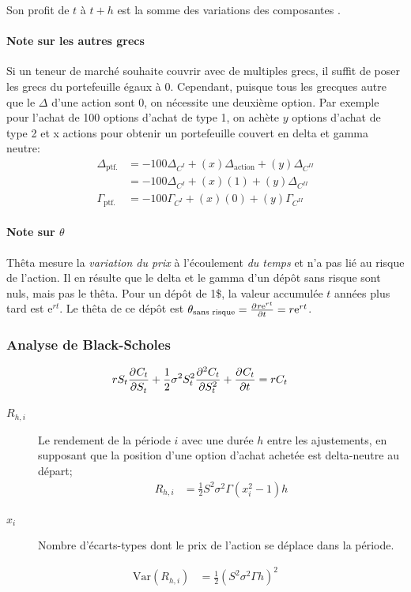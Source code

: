 \documentclass[10pt, french]{article}
\begin{document}
\begin{multicols*}{2}
Son profit de $t$ à $t + h$ est la somme des variations des composantes .\\

\paragraph{Note sur les autres grecs}	Si un teneur de marché souhaite couvrir avec de multiples grecs, il suffit de poser les grecs du portefeuille égaux à 0. Cependant, puisque tous les grecques autre que le $\Delta$ d'une action sont 0, on nécessite une deuxième option. Par exemple pour l'achat de 100 options d'achat de type 1, on achète $y$ options d'achat de type 2 et x actions pour obtenir un portefeuille couvert en delta et gamma neutre:
\begin{align*}
	\Delta_{\text{ptf.}}
	&=	-100 \Delta_{C^{I}} + (x)\Delta_{\text{action}} + (y)\Delta_{C^{II}}	\\
	&=	-100 \Delta_{C^{I}} + (x)(1) + (y)\Delta_{C^{II}}	\\
	\Gamma_{\text{ptf.}}
	&=	-100 \Gamma_{C^{I}} + (x)(0) + (y)\Gamma_{C^{II}}	
\end{align*}

\paragraph{Note sur $\theta$} Thêta mesure la \textit{variation du prix} à l'écoulement \textit{du temps} et n'a pas lié au risque de l'action. Il en résulte que le delta et le gamma d'un dépôt sans risque sont nuls, mais pas le thêta. Pour un dépôt de 1\$, la valeur accumulée $t$ années plus tard est $\textrm{e}^{rt}$. Le thêta de ce dépôt est $\theta_{\text{sans risque}}	=	\deriv{t}{r\textrm{e}^{rt}}	=	r\textrm{e}^{rt}$. 

\subsubsection*{Analyse de Black-Scholes}
\begin{align*}
	r S_{t} \deriv{S_{t}}{C_{t}} + \frac{1}{2}\sigma^{2}S_{t}^{2}\deriv[2]{S_{t}}{C_{t}} + \deriv{t}{C_{t}}	
	&=	r C_{t}	
\end{align*}

\begin{description}
	\item[$R_{h, i}$]	Le rendement de la période $i$ avec une durée $h$ entre les ajustements, en  supposant que la position d'une option d'achat achetée est delta-neutre au départ;
		\begin{align*}
		R_{h, i}	
		&=	\frac{1}{2} S^{2}\sigma^{2}\Gamma(x_{i}^{2} - 1)h
		\end{align*}
	\item[$x_{i}$]	Nombre d'écarts-types dont le prix de l'action se déplace dans la période.
\end{description}
\begin{align*}
	\text{Var}(R_{h, i})
	&=	\frac{1}{2}(S^{2}\sigma^{2}\Gamma h)^{2}
\end{align*}


\end{multicols*}
\end{document}
